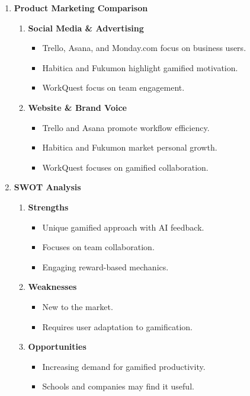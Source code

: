 \begin{enumerate}
\item \textbf{Product Marketing Comparison}
    \begin{enumerate}
        \item \textbf{Social Media \& Advertising}
        \begin{itemize}
            \item Trello, Asana, and Monday.com focus on business users.
            \item Habitica and Fukumon highlight gamified motivation.
            \item WorkQuest focus on team engagement.
        \end{itemize}
        
        \item \textbf{Website \& Brand Voice}
        \begin{itemize}
            \item Trello and Asana promote workflow efficiency.
            \item Habitica and Fukumon market personal growth.
            \item WorkQuest focuses on gamified collaboration.
        \end{itemize}
    \end{enumerate}

    \item \textbf{SWOT Analysis}
    \begin{enumerate}
        \item \textbf{Strengths}
        \begin{itemize}
            \item Unique gamified approach with AI feedback.
            \item Focuses on team collaboration.
            \item Engaging reward-based mechanics.
        \end{itemize}
        
        \item \textbf{Weaknesses}
        \begin{itemize}
            \item New to the market.
            \item Requires user adaptation to gamification.
        \end{itemize}

        \item \textbf{Opportunities}
        \begin{itemize}
            \item Increasing demand for gamified productivity.
            \item Schools and companies may find it useful.
        \end{itemize}


\end{enumerate}
\end{enumerate}
